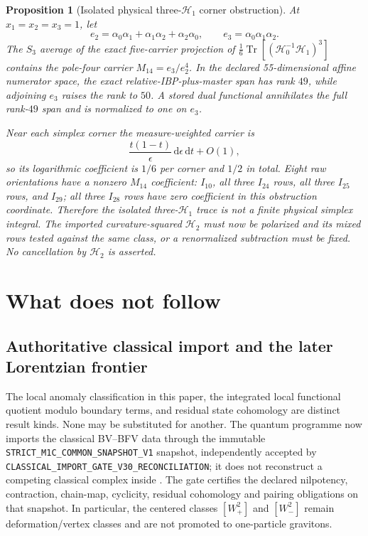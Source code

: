 \documentclass[11pt]{article}
\newtheorem{proposition}[theorem]{Proposition}
\theoremstyle{definition}
\theoremstyle{remark}
\newcommand{\dd}{\mathrm d}
\newcommand{\cert}[1]{\nolinkurl{#1}}
\begin{document}
\begin{proposition}[Isolated physical three-$\mathcal H_1$ corner obstruction]
At $x_1=x_2=x_3=1$, let
\[
 e_2=\alpha_0\alpha_1+\alpha_1\alpha_2+\alpha_2\alpha_0,
 \qquad e_3=\alpha_0\alpha_1\alpha_2.
\]
The $S_3$ average of the exact five-carrier projection of
$\tfrac16\operatorname{Tr}[(\mathcal H_0^{-1}\mathcal H_1)^3]$
contains the pole-four carrier $M_{14}=e_3/e_2^4$.  In the declared
55-dimensional affine numerator space, the exact relative-IBP-plus-master
span has rank $49$, while adjoining $e_3$ raises the rank to $50$.  A stored
dual functional annihilates the full rank-$49$ span and is normalized to one
on $e_3$.

Near each simplex corner the measure-weighted carrier is
\[
 \frac{t(1-t)}{\epsilon}\,\dd\epsilon\,\dd t+O(1),
\]
so its logarithmic coefficient is $1/6$ per corner and $1/2$ in total.
Eight raw orientations have a nonzero $M_{14}$ coefficient: $I_{10}$, all
three $I_{24}$ rows, all three $I_{25}$ rows, and $I_{29}$; all three
$I_{28}$ rows have zero coefficient in this obstruction coordinate.
Therefore the isolated three-$\mathcal H_1$ trace is not a finite physical
simplex integral.  The imported curvature-squared $\mathcal H_2$ must now be
polarized and its mixed rows tested against the same class, or a renormalized
subtraction must be fixed.  No cancellation by $\mathcal H_2$ is asserted.
\end{proposition}

\section{What does not follow}

\subsection*{Authoritative classical import and the later Lorentzian frontier}

The local anomaly classification in this paper, the integrated local
functional quotient modulo boundary terms, and residual state cohomology are
distinct result kinds.  None may be substituted for another.  The quantum
programme now imports the classical BV--BFV data through the immutable
\cert{STRICT_M1C_COMMON_SNAPSHOT_V1} snapshot, independently accepted by
\cert{CLASSICAL_IMPORT_GATE_V30_RECONCILIATION}; it does not reconstruct a
competing classical complex inside .  The gate certifies
the declared nilpotency, contraction, chain-map, cyclicity, residual
cohomology and pairing obligations on that snapshot.  In particular, the
centered classes \([W_+^2]\) and \([W_-^2]\) remain deformation/vertex
classes and are not promoted to one-particle gravitons.
\end{document}
